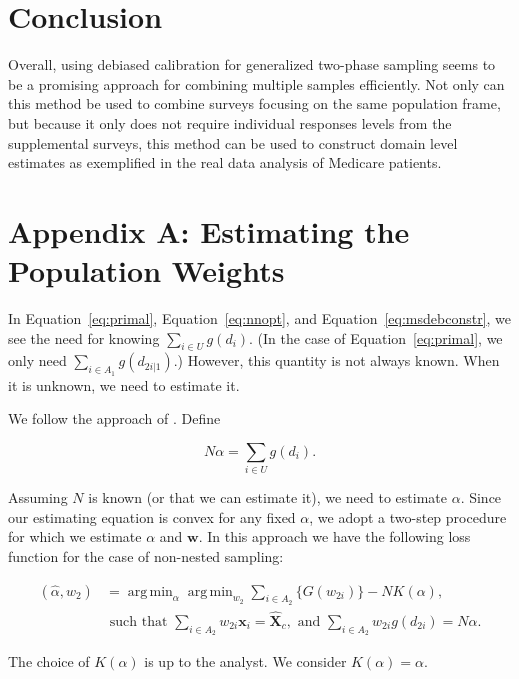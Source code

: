 \documentclass[12pt]{article}
\DeclareMathOperator*{\argmin}{arg\,min}
\renewcommand{\bf}[1]{\mathbf{#1}}
\begin{document}
\section{Conclusion}

Overall, using debiased calibration for generalized two-phase sampling seems to
be a promising approach for combining multiple samples efficiently. Not only can
this method be used to combine surveys focusing on the same population frame,
but because it only does not require individual responses levels from the
supplemental surveys, this method can be used to construct domain level
estimates as exemplified in the real data analysis of Medicare patients.




\section{Appendix A: Estimating the Population Weights}

In Equation~\ref{eq:primal}, Equation~\ref{eq:nnopt}, and
Equation~\ref{eq:msdebconstr}, we see the need for knowing $\sum_{i \in U}
g(d_i)$. (In the case of Equation~\ref{eq:primal}, we only need $\sum_{i \in
A_1} g(d_{2i|1})$.) However, this quantity is not always known. When it is
unknown, we need to estimate it.

We follow the approach of \cite{kwon2024debiased}. Define 

$$N \alpha = \sum_{i \in U} g(d_i).$$

Assuming $N$ is known (or that we can estimate it), we need to estimate
$\alpha$. Since our estimating equation is convex for any fixed $\alpha$, we
adopt a two-step procedure for which we estimate $\alpha$ and $\bf w$. In this
approach we have the following loss function for the case of non-nested sampling:

\begin{align*}
  (\hat \alpha, \hat w_2) 
  &= 
  \argmin_{\alpha} \argmin_{w_2} \sum_{i \in A_2} \{G(w_{2i})\} - NK(\alpha), \\
  &\text{ such that } \sum_{i \in A_2} w_{2i} \bf x_i = \hat{\bf X}_c,
  \text{ and } \sum_{i \in A_2} w_{2i} g(d_{2i}) = N\alpha.
\end{align*}

The choice of $K(\alpha)$ is up to the analyst. We consider $K(\alpha) =
\alpha$.
\end{document}
